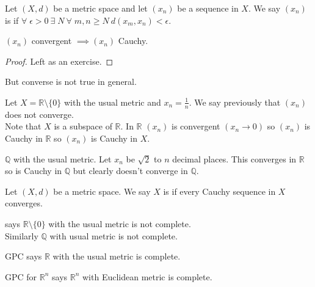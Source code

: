 \begin{definition}
    Let $(X, d)$ be a metric space and let $(x_n)$ be a sequence in $X$.
    We say $(x_n)$ is  if $\forall \; \epsilon > 0 \ \exists \; N \ \forall \; m, n \geq N \ d(x_m, x_n) < \epsilon$.
\end{definition} 

\begin{theorem}
    $(x_n)$ convergent $\implies (x_n)$ Cauchy.
\end{theorem} 
\begin{proof}
    Left as an exercise.
\end{proof} 

But converse is not true in general.

\begin{example} \label{exm:rnot0}
    Let $X = \mathbb{R} \setminus \{0\}$ with the usual metric and $x_n = \frac{1}{n}$.
    We say previously that $(x_n)$ does not converge. \\
    Note that $X$ is a subspace of $\mathbb{R}$.
    In $\mathbb{R}$ $(x_n)$ is convergent $(x_n \to 0)$ so $(x_n)$ is Cauchy in $\mathbb{R}$ so $(x_n)$ is Cauchy in $X$.
\end{example} 

\begin{example}
    $\mathbb{Q}$ with the usual metric.
    Let $x_n$ be $\sqrt{2}$ to $n$ decimal places.
    This converges in $\mathbb{R}$ so is Cauchy in $\mathbb{Q}$ but clearly doesn't converge in $\mathbb{Q}$.
\end{example} 

\begin{definition}[Completeness]
    Let $(X, d)$ be a metric space.
    We say $X$ is  if every Cauchy sequence in $X$ converges.
\end{definition} 

\begin{example}
     says $\mathbb{R} \setminus \{0\}$ with the usual metric is not complete. \\
    Similarly $\mathbb{Q}$ with usual metric is not complete.
\end{example} 

\begin{example}
    GPC says $\mathbb{R}$ with the usual metric is complete.
\end{example} 

\begin{example}
    GPC for $\mathbb{R}^n$ says $\mathbb{R}^n$ with Euclidean metric is complete.
\end{example} 

